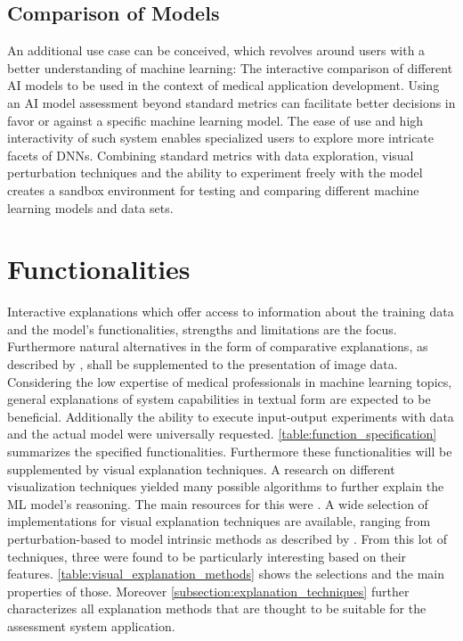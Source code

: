 \documentclass[11pt,a4paper,english]{scrreprt}
\begin{document}
\subsection{Comparison of Models}
An additional use case can be conceived, which revolves around users with a better understanding of machine learning: The interactive comparison of different AI models to be used in the context of medical application development. Using an AI model assessment beyond standard metrics can facilitate better decisions in favor or against a specific machine learning model. The ease of use and high interactivity of such system enables specialized users to explore more intricate facets of DNNs. Combining standard metrics with data exploration, visual perturbation techniques and the ability to experiment freely with the model creates a sandbox environment for testing and comparing different machine learning models and data sets. 

\section{Functionalities}\label{section:functionalities}
Interactive explanations which offer access to information about the training data and the model's functionalities, strengths and limitations are the focus. Furthermore natural alternatives in the form of comparative explanations, as described by \textcite{cai_effects_2019}, shall be supplemented to the presentation of image data. Considering the low expertise of medical professionals in machine learning topics, general explanations of system capabilities in textual form are expected to be beneficial. Additionally the ability to execute input-output experiments with data and the actual model were universally requested. \autoref{table:function_specification} summarizes the specified functionalities. Furthermore these functionalities will be supplemented by visual explanation techniques. A research on different visualization techniques yielded many possible algorithms to further explain the ML model's reasoning. The main resources for this were \textcite{adadi_blackbox_2018,samek_explaining_2021,ribeiro_anchors_2018,arrieta_explainable_2019,ras_explainable_2021}. A wide selection of implementations for visual explanation techniques are available, ranging from perturbation-based to model intrinsic methods as described by \textcite{ras_explainable_2021}. From this lot of techniques, three were found to be particularly interesting based on their features. \autoref{table:visual_explanation_methods} shows the selections and the main properties of those. Moreover \autoref{subsection:explanation_techniques} further characterizes all explanation methods that are thought to be suitable for the assessment system application.
\end{document}
